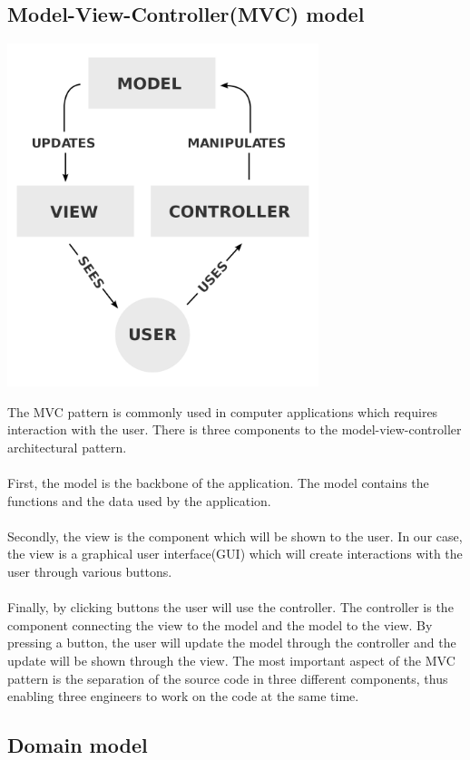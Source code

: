 \documentclass[letterpaper]{article}
\begin{document}
	\subsection{Model-View-Controller(MVC) model}
		\begin{center}
			\includegraphics[height=10cm]{MVC}
		\end{center}
		The MVC pattern is commonly used in computer applications which requires interaction with the user. There is three components to the model-view-controller architectural pattern. \\ \\
		First, the model is the backbone of the application. The model contains the functions and the data used by the application. \\ \\
		Secondly, the view is the component which will be shown to the user. In our case, the view is a graphical user interface(GUI) which will create interactions with the user through various buttons. \\ \\
		Finally, by clicking buttons the user will use the controller. The controller is the component connecting the view to the model and the model to the view. By pressing a button, the user will update the model through the controller and the update will be shown through the view. The most important aspect of the MVC pattern is the separation of the source code in three different components, thus enabling three engineers to work on the code at the same time.
	\newpage
	\subsection{Domain model}
	
\end{document}

